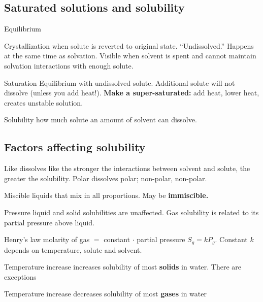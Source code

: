 \begin{mdframed}\subsection{Saturated solutions and solubility}
\begin{multicols}{2}\begin{compactdesc}
    \item[Equilibrium] 
    \item[Crystallization] when solute is reverted to original state.
        ``Undissolved.'' Happens at the same time as solvation. Visible when
        solvent is spent and cannot maintain solvation interactions with enough
        solute.
    \item[Saturation] Equilibrium with undissolved solute. Additional solute
        will not dissolve (unless you add heat!). \textbf{Make a super-saturated: }
        add heat, lower heat, creates unstable solution.
    \item[Solubility] how much solute an amount of solvent can dissolve.
\end{compactdesc}\end{multicols}\end{mdframed}


\begin{mdframed}\subsection{Factors affecting solubility}
\begin{multicols}{2}\begin{compactdesc}
    \item[Like dissolves like] the stronger the interactions between solvent
        and solute, the greater the solubility. Polar dissolves polar; non-polar,
        non-polar.
    \item[Miscible] liquids that mix in all proportions. May be
        \textbf{immiscible.}
    \item[Pressure] liquid and solid solubilities are unaffected. Gas solubility
        is related to its partial pressure above liquid.
    \item[Henry's law] molarity of gas $=$ constant $\cdot$ partial pressure
        $S_g = k P_g$. Constant $k$ depends on temperature, solute and solvent.
    \item[Temperature] increase  increases solubility of most \textbf{solids}
        in water. There are exceptions 
    \item[Temperature] increase decreases solubility of most \textbf{gases}
        in water
\end{compactdesc}\end{multicols}\end{mdframed}


